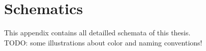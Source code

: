 
\chapter{Schematics}
\label{ch:schemata}
This appendix contains all detailled schemata of this thesis. \\
TODO: some illustrations about color and naming conventions!

\minilof

